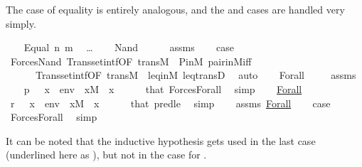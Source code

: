 The case of equality is entirely analogous, and the  and
 cases are handled very simply.
%
\begin{isabelle}
\isamarkupfalse%
\isanewline
\ \ \isamarkupfalse%
\ {\isacharparenleft}Equal\ n\ m{\isacharparenright}\isanewline
\ \ \dots\isanewline
{}\isamarkupfalse%
\isanewline
\ \ \isamarkupfalse%
\ {\isacharparenleft}Nand\ {\isasymphi}\ {\isasympsi}{\isacharparenright}\isanewline
\ \ \isamarkupfalse%
\ assms\isanewline
\ \ \isamarkupfalse%
\ {\isacharquery}case\ \isanewline
\ \ \ \ \isamarkupfalse%
\ Forces{\isacharunderscore}Nand\ Transset{\isacharunderscore}intf{\isacharbrackleft}OF\ trans{\isacharunderscore}M\ {\isacharunderscore}\ P{\isacharunderscore}in{\isacharunderscore}M{\isacharbrackright}\ pair{\isacharunderscore}in{\isacharunderscore}M{\isacharunderscore}iff\isanewline
\ \ \ \ \ \ Transset{\isacharunderscore}intf{\isacharbrackleft}OF\ trans{\isacharunderscore}M\ {\isacharunderscore}\ leq{\isacharunderscore}in{\isacharunderscore}M{\isacharbrackright}\ leq{\isacharunderscore}transD\ \isamarkupfalse%
\ auto\isanewline
{}\isamarkupfalse%
\isanewline
\ \ \isamarkupfalse%
\ {\isacharparenleft}Forall\ {\isasymphi}{\isacharparenright}\isanewline
\ \ \isamarkupfalse%
\ assms\isanewline
\ \ \isamarkupfalse%
\ {\isachardoublequoteopen}p\ {\isasymtturnstile}\ {\isasymphi}\ {\isacharparenleft}{\isacharbrackleft}x{\isacharbrackright}\ {\isacharat}\ env{\isacharparenright}{\isachardoublequoteclose}\ \ {\isachardoublequoteopen}x{\isasymin}M{\isachardoublequoteclose}\ \ x\isanewline
\ \ \ \ \isamarkupfalse%
\ that\ Forces{\isacharunderscore}Forall\ \isamarkupfalse%
\ simp\isanewline
\ \ \isamarkupfalse%
\ \underline{Forall}\ \isanewline
\ \ \isamarkupfalse%
\ {\isachardoublequoteopen}r\ {\isasymtturnstile}\ {\isasymphi}\ {\isacharparenleft}{\isacharbrackleft}x{\isacharbrackright}\ {\isacharat}\ env{\isacharparenright}{\isachardoublequoteclose}\ \ {\isachardoublequoteopen}x{\isasymin}M{\isachardoublequoteclose}\ \ x\isanewline
\ \ \ \ \isamarkupfalse%
\ that\ pred{\isacharunderscore}le{}\ \isamarkupfalse%
\ {\isacharparenleft}simp{\isacharparenright}\isanewline
\ \ \isamarkupfalse%
\ assms\ \underline{Forall}\isanewline
\ \ \isamarkupfalse%
\ {\isacharquery}case\ \isanewline
\ \ \ \ \isamarkupfalse%
\ Forces{\isacharunderscore}Forall\ \isamarkupfalse%
\ simp\isanewline
{}\isamarkupfalse
\end{isabelle}
%
It can be noted that the inductive hypothesis
gets used in the last case (underlined here as
), but not in the case for .


